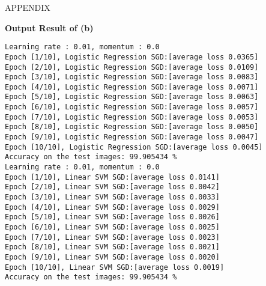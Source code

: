 \documentclass[10pt]{article}
\newcommand{\0}{{\mathbf{0}}}
\newcommand{\1}{{\mathbf{1}}}
\begin{document}
\newpage
{\Large APPENDIX}

\textbf{Output Result of (b)}
\begin{verbatim}
Learning rate : 0.01, momentum : 0.0
Epoch [1/10], Logistic Regression SGD:[average loss 0.0365]
Epoch [2/10], Logistic Regression SGD:[average loss 0.0109]
Epoch [3/10], Logistic Regression SGD:[average loss 0.0083]
Epoch [4/10], Logistic Regression SGD:[average loss 0.0071]
Epoch [5/10], Logistic Regression SGD:[average loss 0.0063]
Epoch [6/10], Logistic Regression SGD:[average loss 0.0057]
Epoch [7/10], Logistic Regression SGD:[average loss 0.0053]
Epoch [8/10], Logistic Regression SGD:[average loss 0.0050]
Epoch [9/10], Logistic Regression SGD:[average loss 0.0047]
Epoch [10/10], Logistic Regression SGD:[average loss 0.0045]
Accuracy on the test images: 99.905434 %
Learning rate : 0.01, momentum : 0.0
Epoch [1/10], Linear SVM SGD:[average loss 0.0141]
Epoch [2/10], Linear SVM SGD:[average loss 0.0042]
Epoch [3/10], Linear SVM SGD:[average loss 0.0033]
Epoch [4/10], Linear SVM SGD:[average loss 0.0029]
Epoch [5/10], Linear SVM SGD:[average loss 0.0026]
Epoch [6/10], Linear SVM SGD:[average loss 0.0025]
Epoch [7/10], Linear SVM SGD:[average loss 0.0023]
Epoch [8/10], Linear SVM SGD:[average loss 0.0021]
Epoch [9/10], Linear SVM SGD:[average loss 0.0020]
Epoch [10/10], Linear SVM SGD:[average loss 0.0019]
Accuracy on the test images: 99.905434 %

\end{verbatim}
\end{document}
